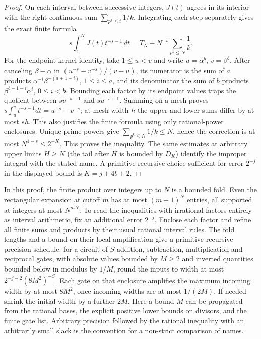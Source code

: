 \begin{proof}
On each interval between successive integers, $J(t)$ agrees in its interior with the right-continuous sum $\sum_{p^k\le t}1/k$. Integrating each step separately gives the exact finite formula
\[
 s\int_1^N J(t)t^{-s-1}\,dt=T_N-N^{-s}\sum_{p^k\le N}\frac1k.
\]
For the endpoint kernel identity, take $1\le u<v$ and write $u=\alpha^b$, $v=\beta^b$. After canceling $\beta-\alpha$ in $(u^{-s}-v^{-s})/(v-u)$, its numerator is the sum of $a$ products $\alpha^{-i}\beta^{-(a+1-i)}$, $1\le i\le a$, and its denominator the sum of $b$ products $\beta^{b-1-i}\alpha^i$, $0\le i<b$. Bounding each factor by its endpoint values traps the quotient between $s v^{-s-1}$ and $s u^{-s-1}$. Summing on a mesh proves $s\int_u^v t^{-s-1}dt=u^{-s}-v^{-s}$; at mesh width $h$ the upper and lower sums differ by at most $sh$. This also justifies the finite formula using only rational-power enclosures. Unique prime powers give $\sum_{p^k\le N}1/k\le N$, hence the correction is at most $N^{1-s}\le2^{-K}$. This proves the inequality. The same estimates at arbitrary upper limits $H\ge N$ (the tail after $H$ is bounded by $D_K$) identify the improper integral with the stated name. A primitive-recursive choice sufficient for error $2^{-j}$ in the displayed bound is $K=j+4b+2$.
\end{proof}

In this proof, the finite product over integers up to $N$ is a bounded fold. Even the rectangular expansion at cutoff $m$ has at most $(m+1)^N$ entries, all supported at integers at most $N^{mN}$. To read the inequalities with irrational factors entirely as interval arithmetic, fix an additional error $2^{-j}$. Enclose each factor and refine all finite sums and products by their usual rational interval rules. The fold lengths and a bound on their local amplification give a primitive-recursive precision schedule: for a circuit of $S$ addition, subtraction, multiplication and reciprocal gates, with absolute values bounded by $M\ge2$ and inverted quantities bounded below in modulus by $1/M$, round the inputs to width at most $2^{-j-2}(8M^2)^{-S}$. Each gate on that enclosure amplifies the maximum incoming width by at most $8M^2$, once incoming widths are at most $1/(2M)$. If needed shrink the initial width by a further $2M$. Here a bound $M$ can be propagated from the rational bases, the explicit positive lower bounds on divisors, and the finite gate list. Arbitrary precision followed by the rational inequality with an arbitrarily small slack is the convention for a non-strict comparison of names.

